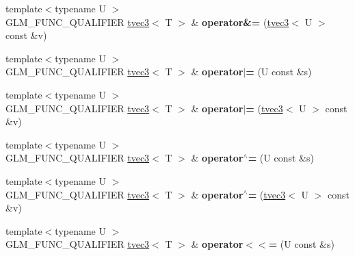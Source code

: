 \begin{DoxyCompactItemize}
\item 
\hypertarget{structglm_1_1detail_1_1tvec3_a3c8c84b97f369895891ce7a930592bd3}{}{\footnotesize template$<$typename U $>$ }\\G\+L\+M\+\_\+\+F\+U\+N\+C\+\_\+\+Q\+U\+A\+L\+I\+F\+I\+E\+R \hyperlink{structglm_1_1detail_1_1tvec3}{tvec3}$<$ T $>$ \& {\bfseries operator\&=} (\hyperlink{structglm_1_1detail_1_1tvec3}{tvec3}$<$ U $>$ const \&v)\label{structglm_1_1detail_1_1tvec3_a3c8c84b97f369895891ce7a930592bd3}

\item 
\hypertarget{structglm_1_1detail_1_1tvec3_af3105fb38aa81e4518589656191dffaa}{}{\footnotesize template$<$typename U $>$ }\\G\+L\+M\+\_\+\+F\+U\+N\+C\+\_\+\+Q\+U\+A\+L\+I\+F\+I\+E\+R \hyperlink{structglm_1_1detail_1_1tvec3}{tvec3}$<$ T $>$ \& {\bfseries operator$\vert$=} (U const \&s)\label{structglm_1_1detail_1_1tvec3_af3105fb38aa81e4518589656191dffaa}

\item 
\hypertarget{structglm_1_1detail_1_1tvec3_afc30d0dddc7b8a7dfa44a0b562382d60}{}{\footnotesize template$<$typename U $>$ }\\G\+L\+M\+\_\+\+F\+U\+N\+C\+\_\+\+Q\+U\+A\+L\+I\+F\+I\+E\+R \hyperlink{structglm_1_1detail_1_1tvec3}{tvec3}$<$ T $>$ \& {\bfseries operator$\vert$=} (\hyperlink{structglm_1_1detail_1_1tvec3}{tvec3}$<$ U $>$ const \&v)\label{structglm_1_1detail_1_1tvec3_afc30d0dddc7b8a7dfa44a0b562382d60}

\item 
\hypertarget{structglm_1_1detail_1_1tvec3_ab121deb8dde4fa69e58eae2f9dbdfe29}{}{\footnotesize template$<$typename U $>$ }\\G\+L\+M\+\_\+\+F\+U\+N\+C\+\_\+\+Q\+U\+A\+L\+I\+F\+I\+E\+R \hyperlink{structglm_1_1detail_1_1tvec3}{tvec3}$<$ T $>$ \& {\bfseries operator$^\wedge$=} (U const \&s)\label{structglm_1_1detail_1_1tvec3_ab121deb8dde4fa69e58eae2f9dbdfe29}

\item 
\hypertarget{structglm_1_1detail_1_1tvec3_ab0f2082a619f76bf3686de62d32a88b1}{}{\footnotesize template$<$typename U $>$ }\\G\+L\+M\+\_\+\+F\+U\+N\+C\+\_\+\+Q\+U\+A\+L\+I\+F\+I\+E\+R \hyperlink{structglm_1_1detail_1_1tvec3}{tvec3}$<$ T $>$ \& {\bfseries operator$^\wedge$=} (\hyperlink{structglm_1_1detail_1_1tvec3}{tvec3}$<$ U $>$ const \&v)\label{structglm_1_1detail_1_1tvec3_ab0f2082a619f76bf3686de62d32a88b1}

\item 
\hypertarget{structglm_1_1detail_1_1tvec3_af31188cf640fb1f71617a29df85ad6c6}{}{\footnotesize template$<$typename U $>$ }\\G\+L\+M\+\_\+\+F\+U\+N\+C\+\_\+\+Q\+U\+A\+L\+I\+F\+I\+E\+R \hyperlink{structglm_1_1detail_1_1tvec3}{tvec3}$<$ T $>$ \& {\bfseries operator$<$$<$=} (U const \&s)\label{structglm_1_1detail_1_1tvec3_af31188cf640fb1f71617a29df85ad6c6}


\end{DoxyCompactItemize}

